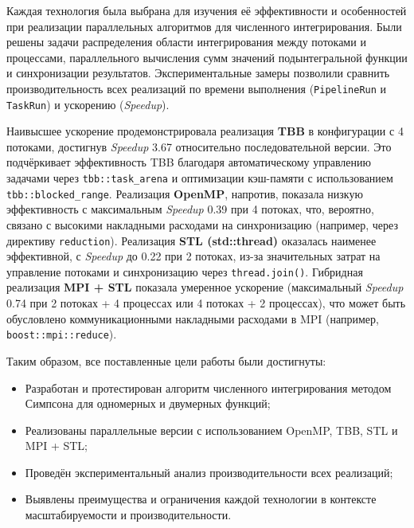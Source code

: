 \documentclass[12pt]{article}
\begin{document}
\hspace*{1.25em}Каждая технология была выбрана для изучения её эффективности и особенностей при реализации параллельных алгоритмов для численного интегрирования. Были решены задачи распределения области интегрирования между потоками и процессами, параллельного вычисления сумм значений подынтегральной функции и синхронизации результатов. Экспериментальные замеры позволили сравнить производительность всех реализаций по времени выполнения (\texttt{PipelineRun} и \texttt{TaskRun}) и ускорению (\textit{Speedup}).

\hspace*{1.25em}Наивысшее ускорение продемонстрировала реализация \textbf{TBB} в конфигурации с 4 потоками, достигнув \textit{Speedup} 3.67 относительно последовательной версии. Это подчёркивает эффективность TBB благодаря автоматическому управлению задачами через \texttt{tbb::task\_arena} и оптимизации кэш-памяти с использованием \texttt{tbb::blocked\_range}. Реализация \textbf{OpenMP}, напротив, показала низкую эффективность с максимальным \textit{Speedup} 0.39 при 4 потоках, что, вероятно, связано с высокими накладными расходами на синхронизацию (например, через директиву \texttt{reduction}). Реализация \textbf{STL (std::thread)} оказалась наименее эффективной, с \textit{Speedup} до 0.22 при 2 потоках, из-за значительных затрат на управление потоками и синхронизацию через \texttt{thread.join()}. Гибридная реализация \textbf{MPI + STL} показала умеренное ускорение (максимальный \textit{Speedup} 0.74 при 2 потоках + 4 процессах или 4 потоках + 2 процессах), что может быть обусловлено коммуникационными накладными расходами в MPI (например, \texttt{boost::mpi::reduce}).

\hspace*{1.25em}Таким образом, все поставленные цели работы были достигнуты:
\begin{itemize}
  \item Разработан и протестирован алгоритм численного интегрирования методом Симпсона для одномерных и двумерных функций;
  \item Реализованы параллельные версии с использованием OpenMP, TBB, STL и MPI + STL;
  \item Проведён экспериментальный анализ производительности всех реализаций;
  \item Выявлены преимущества и ограничения каждой технологии в контексте масштабируемости и производительности.
\end{itemize}
\end{document}
